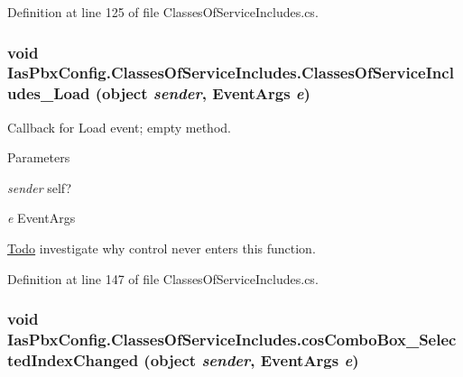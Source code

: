 Definition at line 125 of file ClassesOfServiceIncludes.cs.\hypertarget{class_ias_pbx_config_1_1_classes_of_service_includes_ab305108947e8a6f0bfd118ba379ca272}{
\subsubsection[{ClassesOfServiceIncludes\_\-Load}]{\setlength{\rightskip}{0pt plus 5cm}void IasPbxConfig.ClassesOfServiceIncludes.ClassesOfServiceIncludes\_\-Load (object {\em sender}, \/  EventArgs {\em e})}}
\label{class_ias_pbx_config_1_1_classes_of_service_includes_ab305108947e8a6f0bfd118ba379ca272}


Callback for Load event; empty method. 
\begin{DoxyParams}{Parameters}
\item[{\em sender}]self? \item[{\em e}]EventArgs \end{DoxyParams}
\begin{Desc}
\item[\hyperlink{todo__todo000010}{Todo}]investigate why control never enters this function. \end{Desc}


Definition at line 147 of file ClassesOfServiceIncludes.cs.\hypertarget{class_ias_pbx_config_1_1_classes_of_service_includes_a799b3b7cb516a53d3082b9e547630af4}{
\subsubsection[{cosComboBox\_\-SelectedIndexChanged}]{\setlength{\rightskip}{0pt plus 5cm}void IasPbxConfig.ClassesOfServiceIncludes.cosComboBox\_\-SelectedIndexChanged (object {\em sender}, \/  EventArgs {\em e})}}
\label{class_ias_pbx_config_1_1_classes_of_service_includes_a799b3b7cb516a53d3082b9e547630af4}


